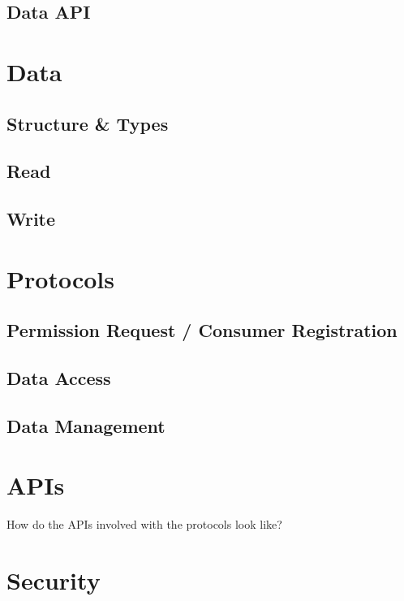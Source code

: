 \documentclass[12pt,english,a4paper,titlepage,cleardoublepage=empty,dottedtoc]{report}
\begin{document}
\subsection{Data API}\label{data-api}

\section{Data}\label{data-1}

\subsection{Structure \& Types}\label{structure-types}

\subsection{Read}\label{read}

\subsection{Write}\label{write}

\section{Protocols}\label{protocols}

\subsection{Permission Request / Consumer
Registration}\label{permission-request-consumer-registration}

\subsection{Data Access}\label{data-access}

\subsection{Data Management}\label{data-management}

\section{APIs}\label{apis}

How do the APIs involved with the protocols look like?

\section{Security}\label{security}
\end{document}
